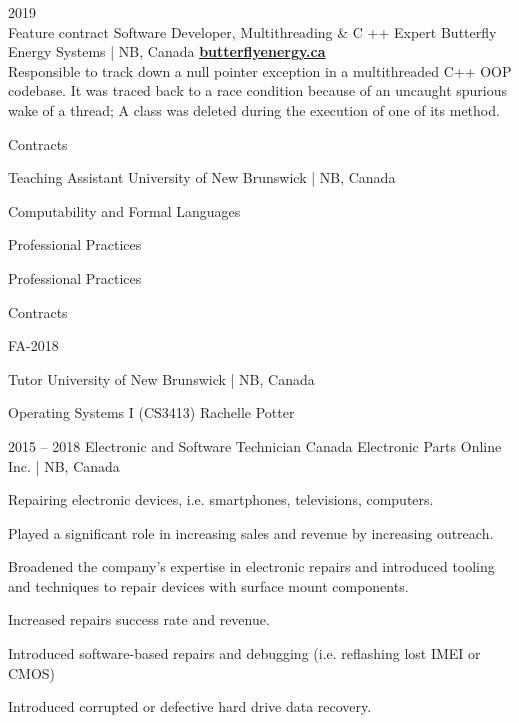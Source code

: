 \documentclass{developercv} %
\begin{document}
\entrys
{2019 \\{\footnotesize Feature contract}}
{Software Developer, Multithreading \& C ++ Expert}
{Butterfly Energy Systems | NB, Canada}
{
	\textbf{\href{http://www.butterflyenergy.ca/home.php}{butterflyenergy.ca}}\\
	Responsible to track down a null pointer exception in a multithreaded C++ OOP codebase.
	It was traced back to a race condition because of an uncaught spurious wake of a thread; A class was deleted during the execution of one of its method.
}

\entrys
{
	Contracts\\
	\begin{tightemize}
	\end{tightemize}
}
{Teaching Assistant}
{University of New Brunswick | NB, Canada}
{
	\begin{tightemize}
		\item Computability and Formal Languages
		\item Professional Practices
		\item Professional Practices
	\end{tightemize}
}

\entrys
{
	Contracts\\
	\begin{tightemize}
		\item[] {\footnotesize FA-2018}
	\end{tightemize}
}
{Tutor}
{University of New Brunswick | NB, Canada}
{
	\begin{tightemize}
		\item Operating Systems I (CS3413) Rachelle Potter
	\end{tightemize}
}

\entrys
{2015 -- 2018}
{Electronic and Software Technician}
{Canada Electronic Parts Online Inc. | NB, Canada}{
	Repairing electronic devices, i.e. smartphones, televisions, computers.
	\begin{tightemize}
		\item Played a significant role in increasing sales and revenue by increasing outreach.
		\item Broadened the company's expertise in electronic repairs and introduced tooling and techniques to repair devices with surface mount components.
		\item Increased repairs success rate and revenue.
		\item Introduced software-based repairs and debugging (i.e. reflashing lost IMEI or CMOS)
		\item Introduced corrupted or defective hard drive data recovery.
	\end{tightemize}
}
\end{document}
